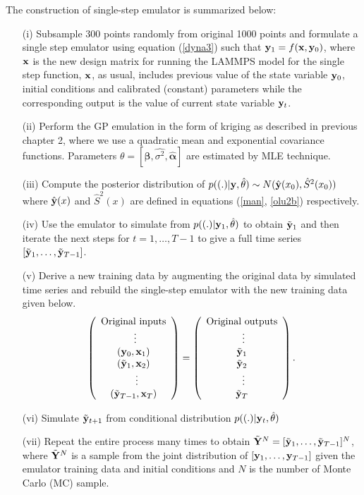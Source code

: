 \documentclass[12pt,titlepage]{report}
\newcommand{\bx}{{\bf x}}
\newcommand{\by}{{\bf y}}
\newcommand{\tby}{{\tilde {\bf y}}}
\newcommand{\tbY}{{\tilde {\bf Y}}}
\newcommand{\hby}{{\hat {\bf y}}}
\newcommand{\hbbeta}{{\hat{\boldsymbol{\beta}}}}
\newcommand{\bhalpha}{{\hat{\boldsymbol{\alpha}}}}
\theoremstyle{definition}
\theoremstyle{remark}
\begin{document}
The construction of single-step emulator is summarized below:
\begin{itemize}
 \item[{(i)}] Subsample 300 points randomly from original 1000 points and formulate a single step emulator using equation (\ref{dyna3}) such that $\by_1=f(\bx,\by_0)$, where $\bx$ is the new design matrix for running the LAMMPS model for the single step function, $\bx$, as usual, includes previous value of the state variable $\by_{0}$, initial conditions and calibrated (constant) parameters while the corresponding output is the value of current state variable $\by_t$.

\item[{(ii)}] Perform the GP emulation in the form of kriging as described in previous chapter 2, where we use a quadratic mean and exponential covariance functions. Parameters $\theta=[\hbbeta, \hat{\sigma^2},\bhalpha]$ are estimated by MLE technique.

\item[{(iii)}] Compute the posterior distribution of $p((.)|\by,\hat\theta)\sim N(\hby(x_0), \hat S^2(x_0))$ where $\hby(x)$ and $\hat S^2(x)$ are defined in equations (\ref{man}, \ref{olu2b}) respectively.

\item[{(iv)}] Use the emulator to simulate from $p((.)|\by_1,\hat\theta)$  to obtain $\tby_{1}$ and then iterate the next steps for $t=1,\ldots,T-1$ to give a full time series $[\tby_1,\ldots,\tby_{T-1}]$. 

\item[{(v)}] Derive a new training data by augmenting the original data by simulated time series and rebuild the single-step emulator with the new training data given below. 
\[ 
\left( \begin{array}{ccc}
\mbox{Original inputs}\\
~\vdots \\
(\by_0,\bx_1)\\
(\tby_1,\bx_2)\\
~~\vdots \\
(\tby_{T-1},\bx_T) \end{array} \right)
 = 
\left( \begin{array}{ccc}
\mbox{Original outputs}\\
~\vdots \\
\tby_1\\
\tby_2 \\
~\vdots \\
\tby_{T}\end{array} \right).
\] 
\item[{(vi)}] Simulate $\tby_{t+1}$ from conditional distribution $p((.)|\by_t,\hat\theta)$  
\item[{(vii)}] Repeat the entire process many times to obtain $\tbY^{N}=[\tby_1,\ldots,\tby_{T-1}]^N$, where
$\tbY^{N}$ is a sample from the joint distribution of $[\by_1,\ldots,\by_{T-1}]$ given the emulator training data and initial conditions and $N$ is the number of Monte Carlo (MC) sample.
\end{itemize}
\end{document}
